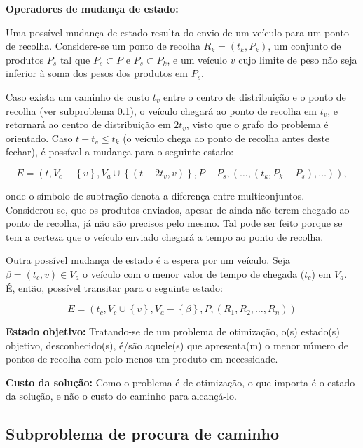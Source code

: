 \documentclass[12pt, a4paper, titlepage]{article}
\begin{document}
\textbf{Operadores de mudança de estado:}

Uma possível mudança de estado resulta do envio de um veículo para um ponto de recolha. Considere-se
um ponto de recolha $R_k = (t_k, P_k)$, um conjunto de produtos $P_s$ tal que $P_s \subset P$ e
$P_s \subset P_k$, e um veículo $v$ cujo limite de peso não seja inferior à soma dos pesos dos
produtos em $P_s$.

Caso exista um caminho de custo $t_v$ entre o centro de distribuição e o ponto de recolha (ver
subproblema \ref{subproblem}), o veículo chegará ao ponto de recolha em $t_v$, e retornará ao centro
de distribuição em $2t_v$, visto que o grafo do problema é orientado. Caso $t + t_v \le t_k$ (o
veículo chega ao ponto de recolha antes deste fechar), é possível a mudança para o seguinte estado:

$$
E = \left (
    t,
    V_c - \left \lbrace v \right \rbrace,
    V_a \cup \left \lbrace (t + 2t_v, v) \right \rbrace,
    P - P_s,
    \left ( \ldots, (t_k, P_k - P_s), \ldots \right )
\right ),
$$

onde o símbolo de subtração denota a diferença entre multiconjuntos. Considerou-se, que os produtos
enviados, apesar de ainda não terem chegado ao ponto de recolha, já não são precisos pelo mesmo. Tal
pode ser feito porque se tem a certeza que o veículo enviado chegará a tempo ao ponto de recolha.

Outra possível mudança de estado é a espera por um veículo. Seja $\beta = (t_c, v) \in V_a$ o
veículo com o menor valor de tempo de chegada ($t_c$) em $V_a$. É, então, possível transitar para o
seguinte estado:

$$
E = \left (
    t_c,
    V_c \cup \left \lbrace v \right \rbrace,
    V_a - \left \lbrace \beta \right \rbrace,
    P,
    (R_1, R_2, \ldots, R_n)
\right )
$$

\textbf{Estado objetivo:} Tratando-se de um problema de otimização, o(s) estado(s) objetivo,
desconhecido(s), é/são aquele(s) que apresenta(m) o menor número de pontos de recolha com pelo menos
um produto em necessidade.

\textbf{Custo da solução:} Como o problema é de otimização, o que importa é o estado da solução, e
não o custo do caminho para alcançá-lo.

\subsection{Subproblema de procura de caminho}
\label{subproblem}
\end{document}
